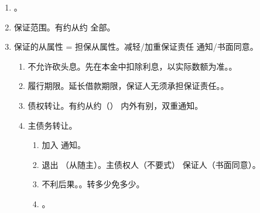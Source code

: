 \begin{enumerate}
        。
        \begin{enumerate}
          \item 有顺序 \yjt {}（核心考点） \yjt {}（独有的，必考）。
                \begin{enumerate}
                  \item 程序上不能单独先起诉。
                  \item 实体上不得单独先执行。
                \end{enumerate}
          \item 没顺序 \yjt {}。，不能推定。。
          \item 当事人在合同中。
        \end{enumerate}
  \item {}。
  \item 保证范围。有约从约 \yjt 全部。
  \item 保证的从属性 = 担保从属性。减轻/加重保证责任 \yjt 通知/书面同意。
        \begin{enumerate}
          \item 不允许砍头息。先在本金中扣除利息，以实际数额为准。。
          \item 履行期限。延长借款期限，保证人无须承担保证责任。。
          \item 债权转让。有约从约（） \yjt 内外有别，双重通知。
          \item 主债务转让。
                \begin{enumerate}
                  \item 加入 \yjt 通知。
                  \item 退出 \yjt {}（从随主）。主债权人（不要式） \yjt 保证人（书面同意）。
                  \item 不利后果。。转多少免多少。
                  \item {}。
                \end{enumerate}

\end{enumerate}
\end{enumerate}
